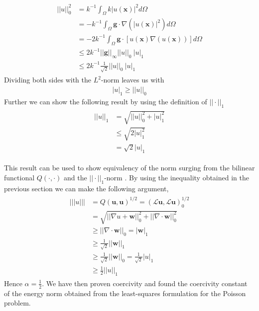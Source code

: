 \begin{align}
	\begin{split}
	||u||_0^2 &= k^{-1}\int_{\Omega}k|u(\mathbf{x})|^2d\Omega \\
	&= -k^{-1}\int_{\Omega}\mathbf{g}\cdot \nabla(|u(\mathbf{x})|^2)d\Omega \\
	&= -2k^{-1}\int_{\Omega}\mathbf{g}\cdot [u(\mathbf{x})\nabla(u(\mathbf{x}))]d\Omega \\
	&\leq 2k^{-1}||\mathbf{g}||_{\infty}||u||_0 \: |u|_1\\
	&\leq 2k^{-1}\frac{1}{\sqrt{2}}||u||_0 \: |u|_1
	\end{split}
	\label{eq:PoincareProof}
\end{align}
Dividing both sides with the $L^2$-norm leaves us with
\begin{align}
	|u|_1 \geq ||u||_0
	\label{eq:PoincareStatement}
\end{align}
Further we can show the following result by using the definition of $||\cdot||_1$
\begin{align}
	\begin{split}
	||u||_1 &= \sqrt{||u||_0^2+|u|_1^2}\\
	&	\leq \sqrt{2|u|_1^2}\\
	&= \sqrt{2}|u|_1
	\end{split}
	\label{eq:NormInequalitySobolev}
\end{align}

This result can be used to show equivalency of the norm surging from the bilinear functional $Q(\cdot,\cdot)$ and the $|| \cdot ||_1$-norm . 
By using the inequality obtained in the previous section we can make the following argument,
\begin{align}
	\begin{split}
	|||u||| 
	&=Q(\mathbf{u},\mathbf{u})^{1/2} 
	= (\mathcal{L}\mathbf{u},\mathcal{L}\mathbf{u})_0^{1/2} \\
	&= \sqrt{||\nabla u+\mathbf{w}||^2_0+||\nabla \cdot \mathbf{w}||^2_0}\\
	&\geq ||\nabla \cdot \mathbf{w}||_0
	= |\mathbf{w}|_1 \\
	&\geq \frac{1}{\sqrt{2}}||\mathbf{w}||_1\\
	&\geq \frac{1}{\sqrt{2}}||\mathbf{w}||_0
	= \frac{1}{\sqrt{2}}|u|_1\\
	&\geq \frac{1}{2}||u||_1
	\end{split}
	\label{eq:resultAlpha}
\end{align}
Hence $\alpha=\frac{1}{2}$. We have then proven coercivity and found the coercivity constant of the energy norm obtained from the least-squares formulation for the Poisson problem.  
%
